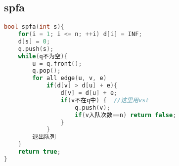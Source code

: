 \subsection{spfa}
		\begin{lstlisting}[language=c++]
bool spfa(int s){
	for(i = 1; i <= n; ++i) d[i] = INF;
	d[s] = 0;
	q.push(s);
	while(q不为空){
		u = q.front();
		q.pop();
		for all edge(u, v, e)
			if(d[v] > d[u] + e){
				d[v] = d[u] + e;
				if(v不在q中) {  //这里用vst
					q.push(v);
					if(v入队次数==n) return false;
				}
			}
		退出队列
	}
	return true;
}
	\end{lstlisting}